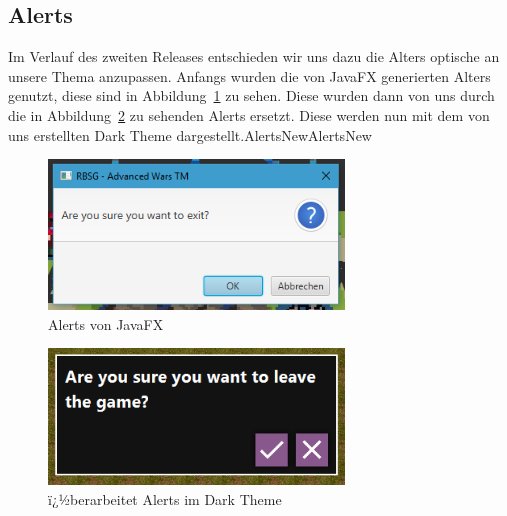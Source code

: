 \documentclass[12pt, titlepage]{scrartcl}
\newcommand{\Abb}[1]{%
	Abbildung\ \ref{#1}%
}
\begin{document}
			\subsection{Alerts}
			Im Verlauf des zweiten Releases entschieden wir uns dazu die Alters optische an unsere Thema anzupassen. Anfangs wurden die von JavaFX generierten Alters genutzt, diese sind in \Abb{AlertsOld} zu sehen. Diese wurden dann von uns durch die in \Abb{AlertsNew} zu sehenden Alerts ersetzt. Diese werden nun mit dem von uns erstellten Dark Theme dargestellt.AlertsNewAlertsNew
			\begin{figure}[H] 
				\centering
				\includegraphics[width=0.7\textwidth]{Alert_Old.PNG}
				\caption{Alerts von JavaFX}
				\label{AlertsOld}
			\end{figure}
		
			\begin{figure}[H] 
				\centering
				\includegraphics[width=0.7\textwidth]{Alerts_New_Style.PNG}
				\caption{ï¿½berarbeitet Alerts im Dark Theme}
				\label{AlertsNew}
			\end{figure} 
		
	\newpage
	\appendix
	\listoffigures
	\listoftables
\end{document}
